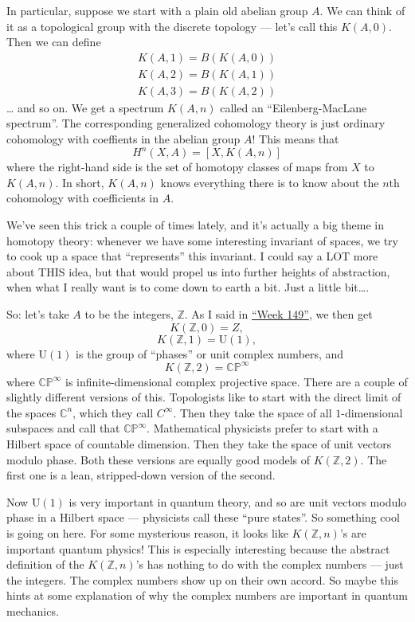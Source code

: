 \documentclass{article}
\begin{document}
In particular, suppose we start with a plain old abelian group \(A\). We
can think of it as a topological group with the discrete topology ---
let's call this \(K(A,0)\). Then we can define \[
  \begin{gathered}
    K(A,1) = B(K(A,0))
  \\K(A,2) = B(K(A,1))
  \\K(A,3) = B(K(A,2))
  \end{gathered}
\] \ldots{} and so on. We get a spectrum \(K(A,n)\) called an
``Eilenberg-MacLane spectrum''. The corresponding generalized cohomology
theory is just ordinary cohomology with coeffients in the abelian group
\(A\)! This means that \[H^n(X,A) = [X, K(A,n)]\] where the right-hand
side is the set of homotopy classes of maps from \(X\) to \(K(A,n)\). In
short, \(K(A,n)\) knows everything there is to know about the \(n\)th
cohomology with coefficients in \(A\).

We've seen this trick a couple of times lately, and it's actually a big
theme in homotopy theory: whenever we have some interesting invariant of
spaces, we try to cook up a space that ``represents'' this invariant. I
could say a LOT more about THIS idea, but that would propel us into
further heights of abstraction, when what I really want is to come down
to earth a bit. Just a little bit\ldots.

So: let's take \(A\) to be the integers, \(\mathbb{Z}\). As I said in
\protect\hyperlink{week149}{``Week 149''}, we then get
\[K(\mathbb{Z},0) = Z,\] \[K(\mathbb{Z},1) = \mathrm{U}(1),\] where
\(\mathrm{U}(1)\) is the group of ``phases'' or unit complex numbers,
and \[K(\mathbb{Z},2) = \mathbb{CP}^\infty\] where
\(\mathbb{CP}^\infty\) is infinite-dimensional complex projective space.
There are a couple of slightly different versions of this. Topologists
like to start with the direct limit of the spaces \(\mathbb{C}^n\),
which they call \(C^\infty\). Then they take the space of all
\(1\)-dimensional subspaces and call that \(\mathbb{CP}^\infty\).
Mathematical physicists prefer to start with a Hilbert space of
countable dimension. Then they take the space of unit vectors modulo
phase. Both these versions are equally good models of
\(K(\mathbb{Z},2)\). The first one is a lean, stripped-down version of
the second.

Now \(\mathrm{U}(1)\) is very important in quantum theory, and so are
unit vectors modulo phase in a Hilbert space --- physicists call these
``pure states''. So something cool is going on here. For some mysterious
reason, it looks like \(K(\mathbb{Z},n)\)'s are important quantum
physics! This is especially interesting because the abstract definition
of the \(K(\mathbb{Z},n)\)'s has nothing to do with the complex numbers
--- just the integers. The complex numbers show up on their own accord.
So maybe this hints at some explanation of why the complex numbers are
important in quantum mechanics.
\end{document}
